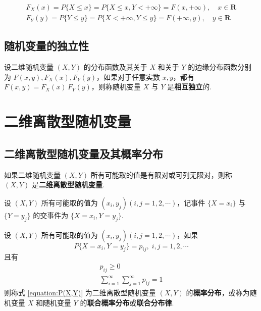 \begin{gather*}
    F_{X}(x) = P\{X \leqslant x\} = P\{X \leqslant x, Y < +\infty\} = F(x, +\infty), \quad x \in \mathbf{R} \\
    F_{Y}(y) = P\{Y \leqslant y\} = P\{X < +\infty, Y \leqslant y\} = F(+\infty, y), \quad y \in \mathbf{R}
\end{gather*}

\subsection{随机变量的独立性}

\begin{definition}
    设二维随机变量 $(X,Y)$ 的分布函数及其关于 $X$ 和关于 $Y$ 的边缘分布函数分别为 $F(x,y), F_{X}(x), F_{Y}(y)$，如果对于任意实数 $x,y$，都有 $F(x,y)=F_{X}(x)\,F_{Y}(y)$，则称随机变量 $X$ 与 $Y$ 是\textbf{相互独立}的.
\end{definition}

\section{二维离散型随机变量}

\subsection{二维离散型随机变量及其概率分布}

\begin{definition}
    如果二维随机变量 $(X,Y)$ 所有可能取的值是有限对或可列无限对，则称 $(X,Y)$ 是\textbf{二维离散型随机变量}.
\end{definition}

设 $(X,Y)$ 所有可能取的值为 $(x_i,y_j)(i,j=1,2,\cdots)$，记事件 $\{X=x_i\}$ 与 $\{Y=y_j\}$ 的交事件为 $\{X=x_i, Y=y_j\}$.

\begin{definition}
    设 $(X,Y)$ 所有可能取的值为 $(x_i,y_j)(i,j=1,2,\cdots)$，如果
    \begin{equation} \label{equation:P(X,Y)}
        P\{X=x_i, Y=y_j\} = p_{ij}, \; i,j=1,2,\cdots
    \end{equation}
    且有
    \begin{gather*}
        p_{ij} \geqslant 0 \\
        \sum_{i=1}^\infty \sum_{j=1}^\infty p_{ij} = 1
    \end{gather*}
    则称式 \eqref{equation:P(X,Y)} 为二维离散型随机变量 $(X,Y)$ 的\textbf{概率分布}，或称为随机变量 $X$ 和随机变量 $Y$ 的\textbf{联合概率分布}或\textbf{联合分布律}.
\end{definition}

